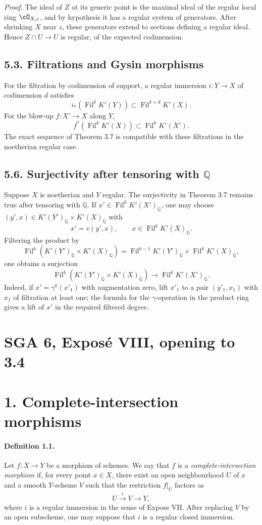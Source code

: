 \documentclass[11pt]{article}
\theoremstyle{plain}
\theoremstyle{definition}
\theoremstyle{remark}
\newcommand{\QQ}{\mathbb Q}
\providecommand{\xto}[1]{\xrightarrow{#1}}
\providecommand{\Fil}{\operatorname{Fil}}
\begin{document}
\emph{Proof.} The ideal of $Z$ at its generic point is the maximal ideal of the regular local ring $\cO_{X,z}$, and by hypothesis it has a regular system of generators. After shrinking $X$ near $z$, these generators extend to sections defining a regular ideal. Hence $Z\cap U\to U$ is regular, of the expected codimension.

\subsection*{5.3. Filtrations and Gysin morphisms}

For the filtration by codimension of support, a regular immersion $i:Y\to X$ of codimension $d$ satisfies
\[
i_*(\Fil^kK'(Y))\subset\Fil^{k+d}K'(X).
\]
For the blow-up $f:X'\to X$ along $Y$,
\[
f^*(\Fil^kK'(X))\subset\Fil^kK'(X').
\]
The exact sequence of Theorem 3.7 is compatible with these filtrations in the noetherian regular case.

\subsection*{5.6. Surjectivity after tensoring with $\QQ$}

Suppose $X$ is noetherian and $Y$ regular. The surjectivity in Theorem 3.7 remains true after tensoring with $\QQ$. If $x'\in\Fil^kK'(X')_\QQ$, one may choose $(y',x)\in K'(Y')_\QQ\times K'(X)_\QQ$ with
\[
x'=v(y',x),\qquad x\in\Fil^kK'(X)_\QQ.
\]
Filtering the product by
\[
\Fil^k(K'(Y')_\QQ\times K'(X)_\QQ)=\Fil^{k-1}K'(Y')_\QQ\times\Fil^kK'(X)_\QQ,
\]
one obtains a surjection
\[
\Fil^k(K'(Y')_\QQ\times K'(X)_\QQ)\longrightarrow\Fil^kK'(X')_\QQ.
\]
Indeed, if $x'=\gamma^k(x'_1)$ with augmentation zero, lift $x'_1$ to a pair $(y'_1,x_1)$ with $x_1$ of filtration at least one; the formula for the $\gamma$-operation in the product ring gives a lift of $x'$ in the required filtered degree.


\clearpage
\section*{SGA 6, Exposé VIII, opening to 3.4}

\section*{1. Complete-intersection morphisms}

\paragraph{Definition 1.1.} Let $f:X\to Y$ be a morphism of schemes. We say that $f$ is a \emph{complete-intersection morphism} if, for every point $x\in X$, there exist an open neighbourhood $U$ of $x$ and a smooth $Y$-scheme $V$ such that the restriction $f|_U$ factors as
\[
U\xto{i}V\to Y,
\]
where $i$ is a regular immersion in the sense of Expose VII. After replacing $V$ by an open subscheme, one may suppose that $i$ is a regular closed immersion.
\end{document}
